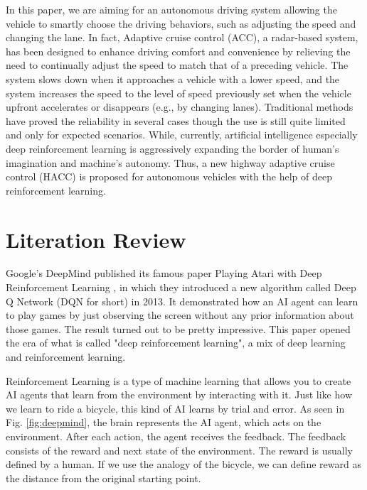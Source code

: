 In this paper, we are aiming for an autonomous driving system allowing the vehicle to smartly choose the driving behaviors, such as adjusting the speed and changing the lane. In fact, Adaptive cruise control (ACC), a radar-based system, has been designed to enhance driving comfort and convenience by relieving the need to continually adjust the speed to match that of a preceding vehicle. The system slows down when it approaches a vehicle with a lower speed, and the system increases the speed to the level of speed previously set when the vehicle upfront accelerates or disappears (e.g., by changing lanes). Traditional methods have proved the reliability in several cases though the use is still quite limited and only for expected scenarios. While, currently, artificial intelligence especially deep reinforcement learning is aggressively expanding the border of human's imagination and machine's autonomy. Thus, a new highway adaptive cruise control (HACC) is proposed for autonomous vehicles with the help of deep reinforcement learning.

\section{Literation Review}


Google's DeepMind published its famous paper Playing Atari with Deep Reinforcement Learning \cite {Mnih2015AtariNature}, in which they introduced a new algorithm called Deep Q Network (DQN for short) in 2013. It demonstrated how an AI agent can learn to play games by just observing the screen without any prior information about those games. The result turned out to be pretty impressive. This paper opened the era of what is called "deep reinforcement learning", a mix of deep learning and reinforcement learning.

Reinforcement Learning is a type of machine learning that allows you to create AI agents that learn from the environment by interacting with it. Just like how we learn to ride a bicycle, this kind of AI learns by trial and error. As seen in Fig. \ref {fig:deepmind}, the brain represents the AI agent, which acts on the environment. After each action, the agent receives the feedback. The feedback consists of the reward and next state of the environment. The reward is usually defined by a human. If we use the analogy of the bicycle, we can define reward as the distance from the original starting point.


